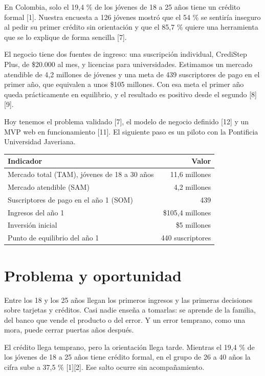 \documentclass[11pt,a4paper]{article}
\begin{document}
En Colombia, solo el 19,4 \% de los jóvenes de 18 a 25 años tiene un crédito formal [1]. Nuestra encuesta a 126 jóvenes mostró que el 54 \% se sentiría inseguro al pedir su primer crédito sin orientación y que el 85,7 \% quiere una herramienta que se lo explique de forma sencilla [7].

El negocio tiene dos fuentes de ingreso: una suscripción individual, CrediStep Plus, de \$20.000 al mes, y licencias para universidades. Estimamos un mercado atendible de 4,2 millones de jóvenes y una meta de 439 suscriptores de pago en el primer año, que equivalen a unos \$105 millones. Con esa meta el primer año queda prácticamente en equilibrio, y el resultado es positivo desde el segundo [8][9].

Hoy tenemos el problema validado [7], el modelo de negocio definido [12] y un MVP web en funcionamiento [11]. El siguiente paso es un piloto con la Pontificia Universidad Javeriana.

\begin{tabularx}{\textwidth}{X r}
  \toprule
  \textbf{Indicador} & \textbf{Valor} \\
  \midrule
  Mercado total (TAM), jóvenes de 18 a 30 años & 11,6 millones \\
  Mercado atendible (SAM) & 4,2 millones \\
  Suscriptores de pago en el año 1 (SOM) & 439 \\
  Ingresos del año 1 & \$105,4 millones \\
  Inversión inicial & \$5 millones \\
  Punto de equilibrio del año 1 & 440 suscriptores \\
  \bottomrule
\end{tabularx}

\section{Problema y oportunidad}

Entre los 18 y los 25 años llegan los primeros ingresos y las primeras decisiones sobre tarjetas y créditos. Casi nadie enseña a tomarlas: se aprende de la familia, del banco que vende el producto o del error. Y un error temprano, como una mora, puede cerrar puertas años después.

El crédito llega temprano, pero la orientación llega tarde. Mientras el 19,4 \% de los jóvenes de 18 a 25 años tiene crédito formal, en el grupo de 26 a 40 años la cifra sube a 37,5 \% [1][2]. Ese salto ocurre sin acompañamiento.
\end{document}
